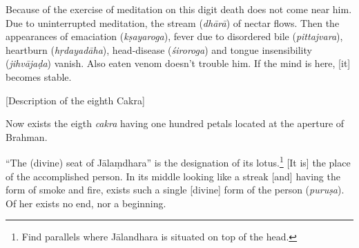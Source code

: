 \begin{otherlanguage}{english}
\begin{tlate}
\end{tlate}
  \begin{tlate} 
Because of the exercise of meditation on this digit death does not come near him. Due to uninterrupted meditation, the stream (\textit{dhārā}) of nectar flows. Then the appearances of emaciation (\textit{kṣayaroga}), fever due to disordered bile (\textit{pittajvara}), heartburn (\textit{hṛdayadāha}), head-disease (\textit{śiroroga}) and tongue insensibility (\textit{jihvājaḍa}) vanish. Also eaten venom doesn't trouble him. If the mind is here, [it] becomes stable.     
  \end{tlate}
    \bigskip
    \centerline{\textrm{\small{[Description of the eighth Cakra]}}}
    \bigskip
          \begin{tlate}
Now exists the eigth \textit{cakra} having one hundred petals located at the aperture of Brahman.
          \end{tlate}
 \begin{tlate}
\end{tlate}
    \begin{tlate}
``The (divine) seat of  Jālaṃdhara'' is the designation of its lotus.\footnote{Find parallels where Jālandhara is situated on top of the head.} [It is] the place of the accomplished person. In its middle looking like a streak [and] having the form of smoke and fire, exists such a single [divine] form of the person (\textit{puruṣa}). Of her exists no end, nor a beginning.

\end{tlate}
\end{otherlanguage}
